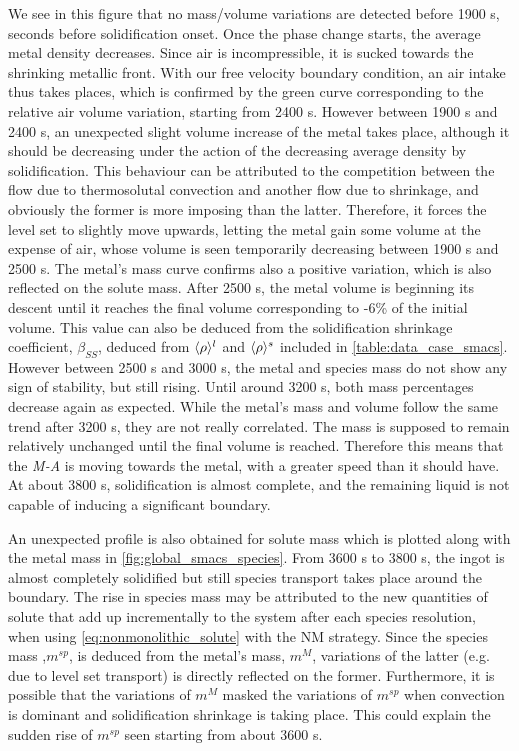 We see in this figure that no mass/volume variations are detected before 1900 s, seconds before solidification onset. Once the phase change starts, the average metal density decreases. Since air is incompressible, it is sucked towards the shrinking metallic front.
With our free velocity boundary condition, an air intake thus takes places, which is confirmed by the green curve corresponding to the relative air volume variation, starting from 2400 s. However between 1900 s and 2400 s, an unexpected slight volume increase of the metal takes place, although it should be decreasing under the action of the decreasing average density by solidification. This behaviour can be attributed to the competition between the flow due to thermosolutal convection and another flow due to shrinkage, and obviously the former is more  imposing than the latter. Therefore, it forces the level set to slightly move upwards, letting the metal gain some volume at the expense of air, whose volume is seen temporarily decreasing between 1900 s and 2500 s.
The metal's mass curve confirms also a positive variation, which is also reflected on the solute mass.
After 2500 s, the metal volume is beginning its descent until it reaches the final volume corresponding to -6\% of the initial volume. 
This value can also be deduced from the solidification shrinkage coefficient, $\beta_{SS}$, deduced from $\langle \rho \rangle^l$ and $\langle \rho \rangle^s$ included in \cref{table:data_case_smacs}.
However between 2500 s and 3000 s, the metal and species mass do not show any sign of stability, but still rising. Until around 3200 s, both mass percentages decrease again as expected.
While the metal's mass and volume follow the same trend after 3200 s, they are not really correlated. The mass is supposed to remain relatively unchanged until the final volume is reached. Therefore this means that the \emph{M-A} is moving towards the metal, with a greater speed than it should have. At about 3800 s, solidification is almost complete, and the remaining liquid is not capable of inducing a significant boundary. 

An unexpected profile is also obtained for solute mass which is plotted along with the metal mass in \cref{fig:global_smacs_species}.
From 3600 s to 3800 s, the ingot is almost completely solidified but still species transport takes place around the boundary.
The rise in species mass may be attributed to the new quantities of solute that add up incrementally to the system after each species resolution, when 
using \cref{eq:nonmonolithic_solute} with the NM strategy. Since the species mass ,$m^{sp}$, is deduced from the metal's mass, $m^M$, variations of the latter
(e.g. due to level set transport) is directly reflected on the former. Furthermore, it is possible that the variations of $m^M$ masked the variations of 
$m^{sp}$ when convection is dominant and solidification shrinkage is taking place. This could explain the sudden rise of $m^{sp}$ seen starting from about 3600 s. 


